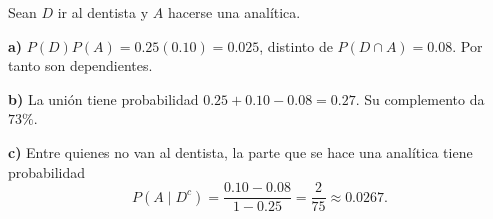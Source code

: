 Sean $D$ ir al dentista y $A$ hacerse una analítica.

\textbf{a)} $P(D)P(A)=0.25(0.10)=0.025$, distinto de
$P(D\cap A)=0.08$. Por tanto son dependientes.

\textbf{b)} La unión tiene probabilidad $0.25+0.10-0.08=0.27$.
Su complemento da $\boxed{73\%}$.

\textbf{c)} Entre quienes no van al dentista, la parte
que se hace una analítica tiene probabilidad
\[
P(A\mid D^c)=\frac{0.10-0.08}{1-0.25}
=\boxed{\frac{2}{75}\approx0.0267}.
\]
